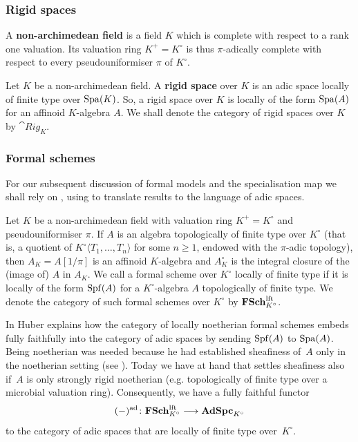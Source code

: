 \subsubsection*{Rigid spaces}

A {\bf non-archimedean field} is a field $K$ which is complete with respect to a rank one valuation. Its valuation ring $K^+ = K^\circ$ is thus $\pi$-adically complete with respect to every pseudouniformiser $\pi$ of $K^\circ$.

Let $K$ be a non-archimedean field. A {\bf rigid space} over $K$ is an adic space locally of finite type over $\operatorname{Spa}(K)$. So, a rigid space over $K$ is locally of the form $\operatorname{Spa}(A)$ for an affinoid $K$-algebra $A$. We shall denote the category of rigid spaces over $K$ by $\cat{Rig}_K$.


\subsubsection*{Formal schemes}

For our subsequent discussion of formal models and the specialisation map we shall rely on \cite{FujiwaraKato}, using \cite[Theorem~II~A.5.1]{FujiwaraKato} to translate results to the language of adic spaces.

Let $K$ be a non-archimedean field with valuation ring $K^+=K^\circ$ and pseudouniformiser $\pi$. If $A$ is an algebra topologically of finite type over $K^\circ$ (that is, a quotient of $K^\circ\langle T_1, \ldots, T_n\rangle$ for some $n\geq 1$, endowed with the $\pi$-adic topology), then $A_K = A[1/\pi]$ is an affinoid $K$-algebra and $A_K^\circ$ is the integral closure of the (image of) $A$ in $A_K$. We call a formal scheme over $K^\circ$ locally of finite type if it is locally of the form $\operatorname{Spf}(A)$ for a $K^\circ$-algebra $A$ topologically of finite type. We denote the category of such formal schemes over $K^\circ$ by $\mathbf{FSch}^{\rm lft}_{K^\circ}$. 

In \cite[\S~4]{Huber94:Generalization} Huber explains how the category of locally noetherian formal schemes embeds fully faithfully into the category of adic spaces by sending $\operatorname{Spf}(A)$ to $\operatorname{Spa}(A)$.
Being noetherian was needed because he had established sheafiness of~$A$ only in the noetherian setting (see \cite[Theorem~2.2]{Huber94:Generalization}).
Today we have \cite{ZavyalovSheafy} at hand that settles sheafiness also if~$A$ is only strongly rigid noetherian (e.g. topologically of finite type over a microbial valuation ring).
Consequently, we have a fully faithful functor
\[
    (-)^{\rm ad} \colon \mathbf{FSch}^{\rm lft}_{K^\circ} \longrightarrow \mathbf{AdSpc}_{K^\circ}
\]
to the category of adic spaces that are locally of finite type over~$K^\circ$.

